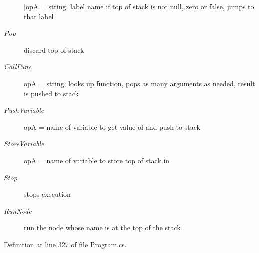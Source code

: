 \begin{Desc}
\begin{description}
{}]op\-A = string\-: label name if top of stack is not null, zero or false, jumps to that label \item[{\em 
\hypertarget{a00048_ad5dfb6ee68ca7469623ad3e459f98894a0ae61bd0474e04c9f1195d4baa0213a0}{Pop}\label{a00048_ad5dfb6ee68ca7469623ad3e459f98894a0ae61bd0474e04c9f1195d4baa0213a0}
}]discard top of stack \item[{\em 
\hypertarget{a00048_ad5dfb6ee68ca7469623ad3e459f98894a3b5e7e8300dc6e4b78cb865c5b10f01a}{Call\-Func}\label{a00048_ad5dfb6ee68ca7469623ad3e459f98894a3b5e7e8300dc6e4b78cb865c5b10f01a}
}]op\-A = string; looks up function, pops as many arguments as needed, result is pushed to stack \item[{\em 
\hypertarget{a00048_ad5dfb6ee68ca7469623ad3e459f98894ab8c46f65015a178516fadbb5ad6c2038}{Push\-Variable}\label{a00048_ad5dfb6ee68ca7469623ad3e459f98894ab8c46f65015a178516fadbb5ad6c2038}
}]op\-A = name of variable to get value of and push to stack \item[{\em 
\hypertarget{a00048_ad5dfb6ee68ca7469623ad3e459f98894a872dc050abaff4beb46e70dadd4088c2}{Store\-Variable}\label{a00048_ad5dfb6ee68ca7469623ad3e459f98894a872dc050abaff4beb46e70dadd4088c2}
}]op\-A = name of variable to store top of stack in \item[{\em 
\hypertarget{a00048_ad5dfb6ee68ca7469623ad3e459f98894a11a755d598c0c417f9a36758c3da7481}{Stop}\label{a00048_ad5dfb6ee68ca7469623ad3e459f98894a11a755d598c0c417f9a36758c3da7481}
}]stops execution \item[{\em 
\hypertarget{a00048_ad5dfb6ee68ca7469623ad3e459f98894ae956bcf888278c168ee9b106927ff6ac}{Run\-Node}\label{a00048_ad5dfb6ee68ca7469623ad3e459f98894ae956bcf888278c168ee9b106927ff6ac}
}]run the node whose name is at the top of the stack \end{description}
\end{Desc}


Definition at line 327 of file Program.\-cs.


